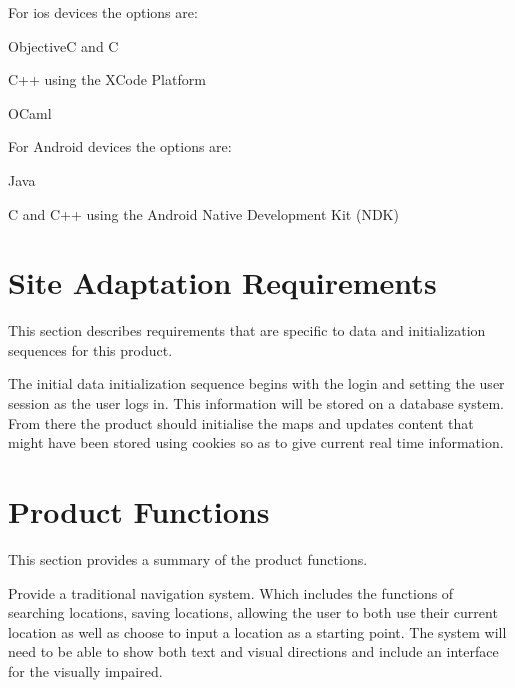\documentclass[11pt]{article}
\begin{document}
		

		For ios devices the options are:

		\begin{list}{}{}

			

			\item ObjectiveC and C

			\item C++ using the XCode Platform

			\item OCaml

		\end{list} 

	

		For Android devices the options are:

			\begin{list}{}{}

				\item Java

				\item C and C++ using the Android Native Development Kit (NDK)

			\end{list}



\section{Site Adaptation Requirements}


This section describes requirements that are specific to data and initialization sequences for this product.

The initial data initialization sequence begins with the login and setting the user session as the user logs in. This information will be stored on a database system. From there the product should initialise the maps and updates content that might have been stored using cookies so as to give current real time information.

\section{Product Functions}


This section provides a summary of the product functions.

	

Provide a traditional navigation system. Which includes the functions of searching locations, saving locations, allowing the user to both use their current location as well as choose to input a location as a starting point. The system will need to be able to show both text and visual directions and include an interface for the visually impaired.
\end{document}
